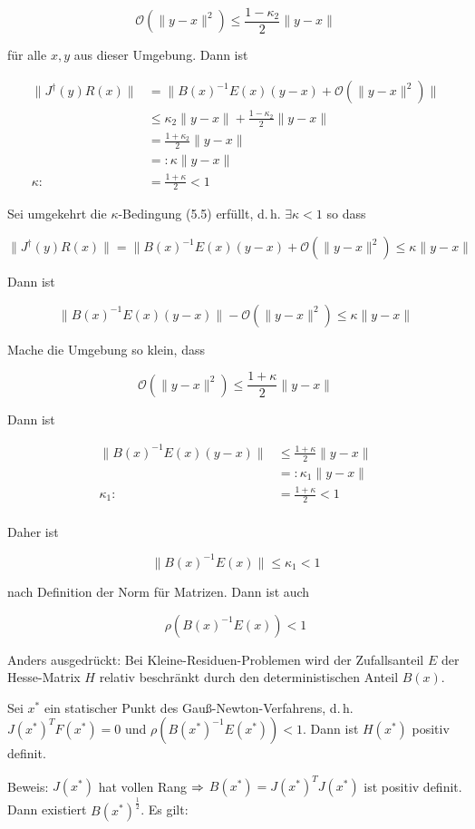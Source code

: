 \[ \mathcal O(\|y-x\|^2) \leq \frac{1-\kappa_2}{2} \|y-x\| \]

für alle $x,y$ aus dieser Umgebung. Dann ist

\begin{align*}
\| J^\dagger(y) R(x)\| &= \| B(x)^{-1} E(x) (y-x) + \mathcal O(\|y-x\|^2) \| \\
& \leq \kappa_2 \|y-x\| + \frac{1-\kappa_2}{2} \|y-x\| \\
&= \frac{1+\kappa_2}{2} \|y-x\| \\
&=: \kappa\|y-x\| \\
\kappa :&= \frac{1+\kappa}{2} < 1
\end{align*}

Sei umgekehrt die $\kappa$-Bedingung (5.5) erfüllt, d.\,h. $\exists \kappa < 1$ so dass

\[ \| J^\dagger(y) R(x) \| = \| B(x)^{-1} E(x) (y-x) + \mathcal O(\|y-x\|^2) \leq \kappa \|y-x\| \]

Dann ist

\[ \| B(x)^{-1} E(x) (y-x)\| - \mathcal O(\|y-x\|^2) \leq \kappa \|y-x\| \]

Mache die Umgebung so klein, dass

\[ \mathcal O(\|y-x\|^2) \leq \frac{1+\kappa}{2} \|y-x\| \]

Dann ist

\begin{align*}
\| B(x)^{-1} E(x) (y-x) \| & \leq \frac{1+\kappa}{2} \|y-x\| \\
&=: \kappa_1 \|y-x\| \\
\kappa_1 :&= \frac{1+\kappa}{2} < 1 \\
\end{align*}

Daher ist

\[ \| B(x)^{-1} E(x) \| \leq \kappa_1 < 1 \]

nach Definition der Norm für Matrizen. Dann ist auch

\[ \rho( B(x)^{-1} E(x)) < 1 \]

Anders ausgedrückt: Bei Kleine-Residuen-Problemen wird der Zufallsanteil $E$ der Hesse-Matrix $H$ relativ beschränkt durch den deterministischen Anteil $B(x)$.


Sei $x^*$ ein statischer Punkt des Gauß-Newton-Verfahrens, d.\,h. $J(x^*)^T F(x^*) = 0$ und $\rho (B(x^*)^{-1} E(x^*)) < 1$. Dann ist $H(x^*)$ positiv definit.

Beweis: $J(x^*)$ hat vollen Rang $\Rightarrow$ $B(x^*) = J(x^*)^T J(x^*)$ ist positiv definit. Dann existiert $B(x^*)^{\frac 12}$. Es gilt:

